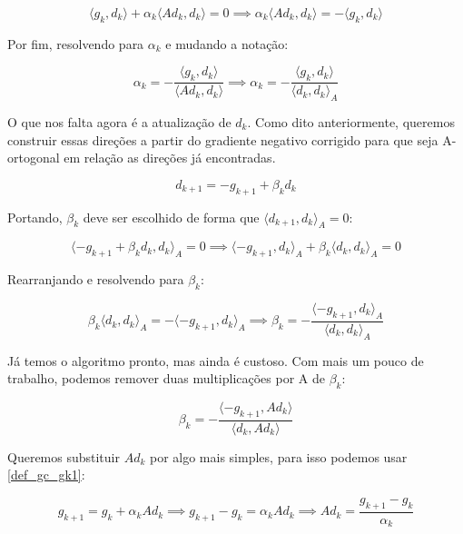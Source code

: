\begin{equation}
\langle g_k, d_k \rangle + \alpha_k \langle A d_k, d_k \rangle = 0 \implies \alpha_k \langle A d_k, d_k \rangle = - \langle g_k, d_k \rangle
\end{equation}

Por fim, resolvendo para \(\alpha_k\) e mudando a notação:

\begin{equation}
\alpha_k= - \frac{\langle g_k, d_k \rangle}{\langle A d_k, d_k \rangle} \implies \alpha_k= - \frac{\langle g_k, d_k \rangle}{\langle d_k, d_k \rangle_A}
\end{equation}


O que nos falta agora é a atualização de \(d_k\). Como dito anteriormente, queremos
construir essas direções a partir do gradiente negativo corrigido para que seja
A-ortogonal em relação as direções já encontradas.

\begin{equation}
\label{def_dk1}
d_{k+1} = -g_{k+1} + \beta_k d_k
\end{equation}

Portando, \(\beta_k\) deve ser escolhido de forma que \(\langle d_{k+1}, d_k \rangle_A = 0\):

\begin{equation}
\langle -g_{k+1} + \beta_k d_k, d_k \rangle_A = 0 \implies \langle -g_{k+1}, d_k \rangle_A + \beta_k \langle d_k, d_k \rangle_A = 0
\end{equation}

Rearranjando e resolvendo para \( \beta_k \):

\begin{equation}
  \beta_k \langle d_k, d_k \rangle_A = - \langle -g_{k+1}, d_k \rangle_A \implies \beta_k = -\frac{\langle -g_{k+1}, d_k \rangle_A}{\langle d_k, d_k \rangle_A}
\end{equation}

Já temos o algoritmo pronto, mas ainda é custoso. Com mais um pouco de trabalho, podemos
remover duas multiplicações por A de \(\beta_k\):

\begin{equation}
\label{def_beta_gc}
\beta_k = - \frac{\langle -g_{k+1}, Ad_k \rangle}{\langle d_k, Ad_k \rangle}
\end{equation}

Queremos substituir \(Ad_k\) por algo mais simples, para isso podemos usar \ref{def_gc_gk1}:

\begin{equation}
\label{def_adk}
g_{k+1} = g_k + \alpha_k A d_k \implies g_{k+1} - g_k = \alpha_k A d_k \implies A d_k = \frac{g_{k+1} - g_k}{\alpha_k}
\end{equation}

